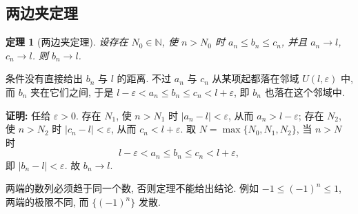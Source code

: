 \documentclass[UTF8,openany]{ctexbook}
\theoremstyle{chinesetextbook}
\newtheorem{theorem}{定理}[section]
\newenvironment{cnproof}{\par\indent\textbf{证明:} \ignorespaces}{\par}
\begin{document}
\subsection{两边夹定理}
\begin{theorem}[两边夹定理]
设存在 $N_0\in\mathbb N$, 使 $n>N_0$ 时 $a_n\le b_n\le c_n$, 并且 $a_n\to l$, $c_n\to l$. 则 $b_n\to l$.
\end{theorem}
条件没有直接给出 $b_n$ 与 $l$ 的距离. 不过 $a_n$ 与 $c_n$ 从某项起都落在邻域 $U(l,\varepsilon)$ 中, 而 $b_n$ 夹在它们之间, 于是 $l-\varepsilon<a_n\le b_n\le c_n<l+\varepsilon$, 即 $b_n$ 也落在这个邻域中.
\begin{cnproof}
任给 $\varepsilon>0$. 存在 $N_1$, 使 $n>N_1$ 时 $|a_n-l|<\varepsilon$, 从而 $a_n>l-\varepsilon$; 存在 $N_2$, 使 $n>N_2$ 时 $|c_n-l|<\varepsilon$, 从而 $c_n<l+\varepsilon$. 取 $N=\max\{N_0,N_1,N_2\}$, 当 $n>N$ 时
\[
l-\varepsilon<a_n\le b_n\le c_n<l+\varepsilon,
\]
即 $|b_n-l|<\varepsilon$. 故 $b_n\to l$.
\end{cnproof}
两端的数列必须趋于同一个数, 否则定理不能给出结论. 例如 $-1\le(-1)^n\le1$, 两端的极限不同, 而 $\{(-1)^n\}$ 发散.
\end{document}

